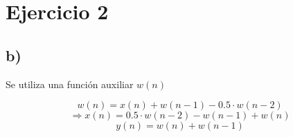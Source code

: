 \documentclass[../../guia1.tex]{subfiles}
\begin{document}
\section*{Ejercicio 2}

\subsection*{b)}
Se utiliza una funci\'on auxiliar $w(n)$

\[ w(n) = x(n) + w(n-1) - 0.5 \cdot w(n-2) \]
\[ \Rightarrow x(n) = 0.5\cdot w(n-2) - w(n-1) + w(n) \]
\[ y(n) = w(n) + w(n-1) \]
\end{document}
